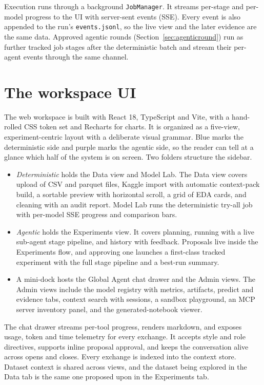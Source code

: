Execution runs through a background \texttt{JobManager}. It streams per-stage and per-model progress to the UI with server-sent events (SSE). Every event is also appended to the run's \texttt{events.jsonl}, so the live view and the later evidence are the same data. Approved agentic rounds (Section~\ref{sec:agenticround}) run as further tracked job stages after the deterministic batch and stream their per-agent events through the same channel.

\section{The workspace UI}
\label{sec:ui}

The web workspace is built with React 18, TypeScript and Vite, with a hand-rolled CSS token set and Recharts for charts. It is organized as a five-view, experiment-centric layout with a deliberate visual grammar. Blue marks the deterministic side and purple marks the agentic side, so the reader can tell at a glance which half of the system is on screen. Two folders structure the sidebar.

\begin{itemize}
	\item \emph{Deterministic} holds the Data view and Model Lab. The Data view covers upload of CSV and parquet files, Kaggle import with automatic context-pack build, a sortable preview with horizontal scroll, a grid of EDA cards, and cleaning with an audit report. Model Lab runs the deterministic try-all job with per-model SSE progress and comparison bars.
	\item \emph{Agentic} holds the Experiments view. It covers planning, running with a live sub-agent stage pipeline, and history with feedback. Proposals live inside the Experiments flow, and approving one launches a first-class tracked experiment with the full stage pipeline and a best-run summary.
	\item A mini-dock hosts the Global Agent chat drawer and the Admin views. The Admin views include the model registry with metrics, artifacts, predict and evidence tabs, context search with sessions, a sandbox playground, an MCP server inventory panel, and the generated-notebook viewer.
\end{itemize}

The chat drawer streams per-tool progress, renders markdown, and exposes usage, token and time telemetry for every exchange. It accepts style and role directives, supports inline proposal approval, and keeps the conversation alive across opens and closes. Every exchange is indexed into the context store. Dataset context is shared across views, and the dataset being explored in the Data tab is the same one proposed upon in the Experiments tab.

